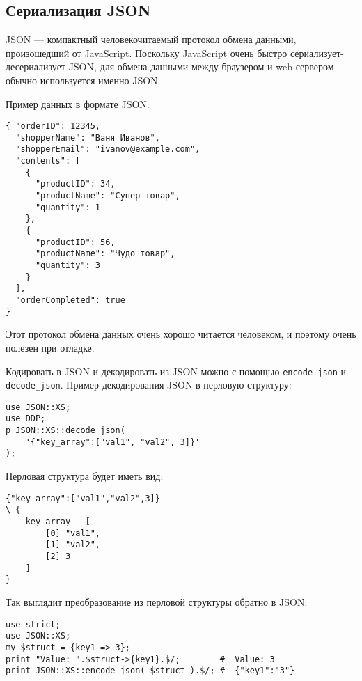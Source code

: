 \subsection{Сериализация JSON}  %
JSON --- компактный человекочитаемый протокол обмена данными, произошедший от JavaScript. Поскольку JavaScript очень быстро сериализует-десериализует JSON, для обмена данными между браузером и web-сервером обычно используется именно JSON.

Пример данных в формате JSON:
\begin{verbatim}
{ "orderID": 12345,
  "shopperName": "Ваня Иванов",
  "shopperEmail": "ivanov@example.com",
  "contents": [
    {
      "productID": 34,
      "productName": "Супер товар",
      "quantity": 1
    },
    {
      "productID": 56,
      "productName": "Чудо товар",
      "quantity": 3
    }
  ],
  "orderCompleted": true
}
\end{verbatim}
Этот протокол обмена данных очень хорошо читается человеком, и поэтому очень полезен при отладке.

Кодировать в JSON и декодировать из JSON можно с помощью \verb|encode_json| и \verb|decode_json|. Пример декодирования JSON в перловую структуру:
\begin{verbatim}
use JSON::XS;
use DDP;
p JSON::XS::decode_json(
    '{"key_array":["val1", "val2", 3]}'
);
\end{verbatim}
Перловая структура будет иметь вид:
\begin{verbatim}
{"key_array":["val1","val2",3]}
\ {
    key_array   [
        [0] "val1",
        [1] "val2",
        [2] 3
    ]
}
\end{verbatim}
Так выглядит преобразование из перловой структуры обратно в JSON:
\begin{verbatim}
use strict;
use JSON::XS;
my $struct = {key1 => 3};
print "Value: ".$struct->{key1}.$/;        #  Value: 3
print JSON::XS::encode_json( $struct ).$/; #  {"key1":"3"}
\end{verbatim}


